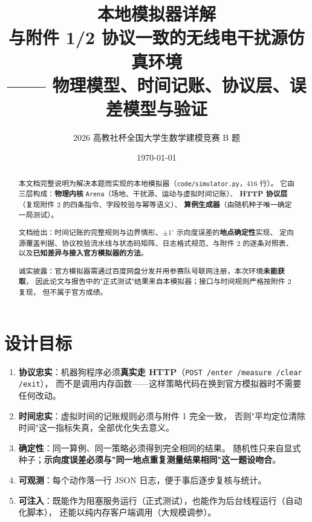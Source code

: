

\title{\heiti 本地模拟器详解\\[4pt]
       \large 与附件 1/2 协议一致的无线电干扰源仿真环境\\[2pt]
       \normalsize —— 物理模型、时间记账、协议层、误差模型与验证}
\author{2026 高教社杯全国大学生数学建模竞赛 B 题}
\date{\today}


\maketitle
\thispagestyle{fancy}

\begin{abstract}
\noindent
本文档完整说明为解决本题而实现的本地模拟器（\texttt{code/simulator.py}，416 行）。
它由三层构成：\textbf{物理内核} \texttt{Arena}（场地、干扰源、运动与虚拟时间记账）、
\textbf{HTTP 协议层}（复现附件 2 的四条指令、字段校验与幂等语义）、
\textbf{算例生成器}（由随机种子唯一确定一局测试）。

文档给出：时间记账的完整规则与边界情形、$\pm1^{\circ}$ 示向度误差的\textbf{地点确定性}实现、
定向源覆盖判据、协议校验流水线与状态码矩阵、日志格式规范、与附件 2 的逐条对照表、
以及\textbf{已知差异与接入官方模拟器的方法}。

诚实披露：官方模拟器需通过百度网盘分发并用参赛队号联网注册，本次环境\textbf{未能获取}，
因此论文与报告中的"正式测试"结果来自本模拟器；接口与时间规则严格按附件 2 复现，
但不属于官方成绩。
\end{abstract}

\tableofcontents
\newpage

\section{设计目标}

\begin{enumerate}[leftmargin=1.8em]
  \item \textbf{协议忠实}：机器狗程序必须\textbf{真实走 HTTP}（\texttt{POST /enter /measure /clear /exit}），
        而不是调用内存函数——这样策略代码在换到官方模拟器时不需要任何改动。
  \item \textbf{时间忠实}：虚拟时间的记账规则必须与附件 1 完全一致，
        否则"平均定位清除时间"这一指标失真，全部优化失去意义。
  \item \textbf{确定性}：同一算例、同一策略必须得到完全相同的结果。
        随机性只来自显式种子；\textbf{示向度误差必须与"同一地点重复测量结果相同"这一题设吻合}。
  \item \textbf{可观测}：每个动作落一行 JSON 日志，便于事后逐步复核与统计。
  \item \textbf{可注入}：既能作为阻塞服务运行（正式测试），也能作为后台线程运行（自动化脚本），
        还能以纯内存客户端调用（大规模调参）。
\end{enumerate}

